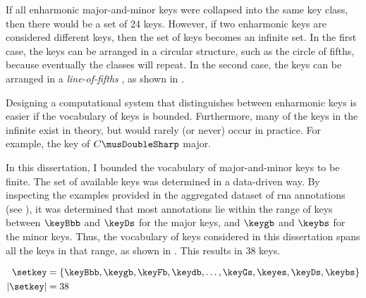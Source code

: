 
If all enharmonic major-and-minor keys were collapsed into
the same key class, then there would be a set of 24 keys.
However, if two enharmonic keys are considered different
keys, then the set of keys becomes an infinite set. In the
first case, the keys can be arranged in a circular
structure, such as the circle of fifths, because eventually
the classes will repeat. In the second case, the keys can be
arranged in a \emph{line-of-fifths}
\parencite{temperley2000line}, as shown in
.


Designing a computational system that distinguishes between
enharmonic keys is easier if the vocabulary of keys is
bounded. Furthermore, many of the keys in the infinite exist
in theory, but would rarely (or never) occur in practice.
For example, the key of $C\musDoubleSharp$ major.

In this dissertation, I bounded the vocabulary of
major-and-minor keys to be finite. The set of available keys
was determined in a data-driven way. By inspecting the
examples provided in the aggregated dataset of \gls{rna}
annotations (see ),
it was determined that most annotations lie within the range
of keys between $\keyBbb$ and $\keyDs$ for the major keys,
and $\keygb$ and $\keybs$ for the minor keys. Thus, the
vocabulary of keys considered in this dissertation spans all
the keys in that range, as shown in . This
results in 38 keys.

\begin{equation}
    \label{eq:keys}
    \begin{split}
    \setkey &= \{ \keyBbb, \keygb, \keyFb, \keydb, \dotsc,
    \keyGs, \keyes, \keyDs, \keybs \}\\
    | \setkey | &= 38
    \end{split}
\end{equation}
